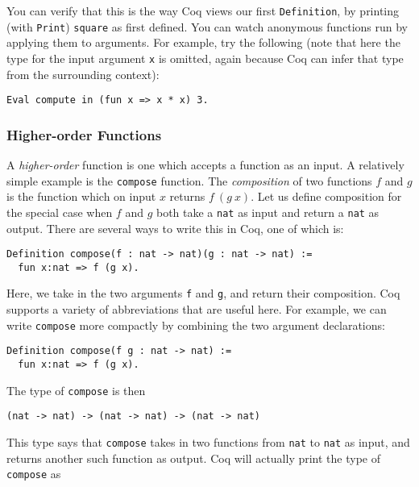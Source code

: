 \documentclass{book}[12pt]
\begin{document}
\noindent You can verify that this is the way Coq views our first
\texttt{Definition}, by printing (with \texttt{Print}) \texttt{square}
as first defined.  You can watch anonymous functions run by applying
them to arguments.  For example, try the following (note that here the
type for the input argument \texttt{x} is omitted, again because Coq
can infer that type from the surrounding context):

\begin{verbatim}
Eval compute in (fun x => x * x) 3.
\end{verbatim}

\subsubsection{Higher-order Functions}

A \emph{higher-order} function is one which accepts a function as an
input.  A relatively simple example is the \texttt{compose} function.
The \emph{composition} of two functions $f$ and $g$ is the function
which on input $x$ returns $f\ (g\ x)$.  Let us define composition for
the special case when $f$ and $g$ both take a \texttt{nat} as input
and return a \texttt{nat} as output.  There are several ways to write
this in Coq, one of which is:

\begin{verbatim}
Definition compose(f : nat -> nat)(g : nat -> nat) := 
  fun x:nat => f (g x).
\end{verbatim}

\noindent Here, we take in the two arguments \texttt{f} and
\texttt{g}, and return their composition.  Coq supports a variety of
abbreviations that are useful here.  For example, we can write
\texttt{compose} more compactly by combining the two argument
declarations:

\begin{verbatim}
Definition compose(f g : nat -> nat) := 
  fun x:nat => f (g x).
\end{verbatim}

The type of \texttt{compose} is then

\begin{verbatim}
(nat -> nat) -> (nat -> nat) -> (nat -> nat)
\end{verbatim}

\noindent This type says that \texttt{compose} takes in two functions
from \texttt{nat} to \texttt{nat} as input, and returns another such
function as output.  Coq will actually print the type of \texttt{compose}
as 
\end{document}

